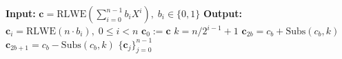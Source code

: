 \begin{algorithm}
\caption{Homomorphic placing $\mathsf{HomPlacing}$ for one slot}
\label{alg:expandRlwe}
\begin{algorithmic}[1]
    \State \textbf{Input:} $\mathbf{c} = \mathrm{RLWE}(\sum_{i=0}^{n-1} b_i X^i),\;b_i\in\{0,1\}$
    \State \textbf{Output:} $\mathbf{c}_i = \mathrm{RLWE}(n\cdot b_i),\; 0 \leq i < n$
    \State $\mathbf{c}_0 := \mathbf{c}$
        \State $k = n/2^{i - 1} + 1$
            \State $\mathbf{c}_{2b} = c_b + \mathrm{Subs}(c_b, k)$
            \State $\mathbf{c}_{2b + 1} = c_b - \mathrm{Subs}(c_b, k)$
        \EndFor
    \EndFor
    \State\Return $\{\mathbf{c}_j\}^{n-1}_{j=0}$
\end{algorithmic}
\end{algorithm}